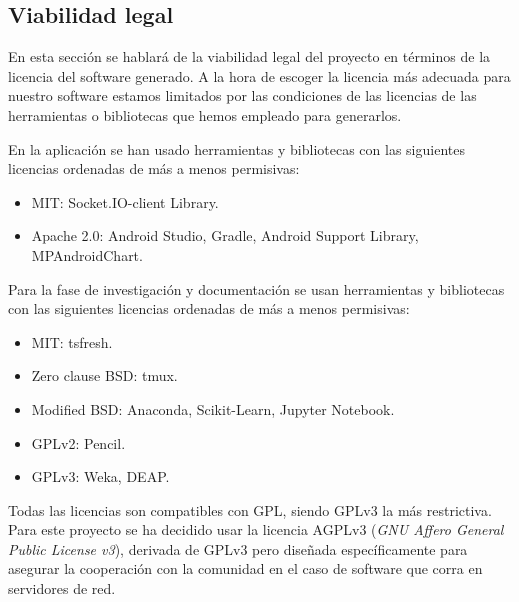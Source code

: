 \subsection{Viabilidad legal}

En esta sección se hablará de la viabilidad legal del proyecto en términos de la licencia del software generado. A la hora de escoger la licencia más adecuada para nuestro software estamos limitados por las condiciones de las licencias de las herramientas o bibliotecas que hemos empleado para generarlos. 

En la aplicación se han usado herramientas y bibliotecas con las siguientes licencias ordenadas de más a menos permisivas: 

\begin{itemize}
	\item MIT: Socket.IO-client Library. 
	\item Apache 2.0: Android Studio, Gradle, Android Support Library, MPAndroidChart. 
\end{itemize}

Para la fase de investigación y documentación se usan herramientas y bibliotecas con las siguientes licencias ordenadas de más a menos permisivas: 

\begin{itemize}
	\item MIT: tsfresh.
	\item Zero clause BSD: tmux. 
	\item Modified BSD: Anaconda, Scikit-Learn, Jupyter Notebook.  
	\item GPLv2: Pencil. 
	\item GPLv3: Weka, DEAP. 
\end{itemize}

Todas las licencias son compatibles con GPL, siendo GPLv3 la más restrictiva. Para este proyecto se ha decidido usar la licencia AGPLv3\cite{wiki:agpl} (\textit{GNU Affero General Public License v3}), derivada de GPLv3 pero diseñada específicamente para asegurar la cooperación con la comunidad en el caso de software que corra en servidores de red.





